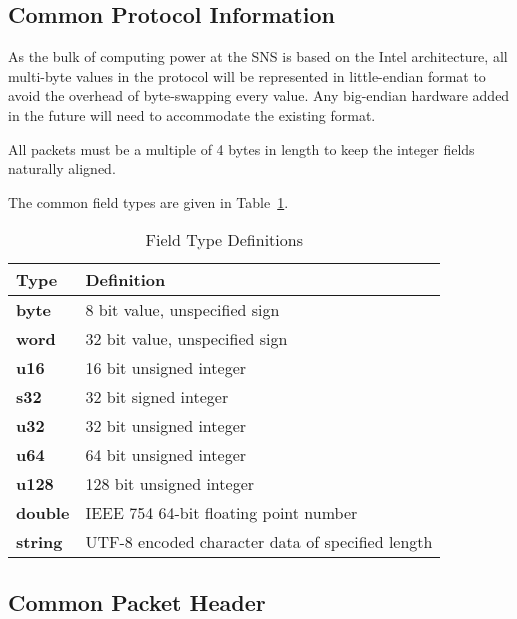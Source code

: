 \subsection{Common Protocol Information}

As the bulk of computing power at the SNS is based on the Intel architecture,
all multi-byte values in the protocol will be represented in little-endian
format to avoid the overhead of byte-swapping every value. Any big-endian
hardware added in the future will need to accommodate the existing format.

All packets must be a multiple of 4 bytes in length to keep the integer
fields naturally aligned.

The common field types are given in Table~\ref{table:protocol_field_types}.

\begin{table}[h]
  \begin{center}
    \begin{tabular}{l | l}
	Type & Definition \\
	\hline
	{\bf byte} & 8 bit value, unspecified sign \\
	{\bf word} & 32 bit value, unspecified sign \\
	{\bf u16} & 16 bit unsigned integer \\
	{\bf s32} & 32 bit signed integer \\
	{\bf u32} & 32 bit unsigned integer \\
	{\bf u64} & 64 bit unsigned integer \\
	{\bf u128} & 128 bit unsigned integer \\
	{\bf double} & IEEE 754 64-bit floating point number \\
	{\bf string} & UTF-8 encoded character data of specified length \\
    \end{tabular}
  \end{center}
  \caption {Field Type Definitions}
  \label{table:protocol_field_types}
\end{table}

\subsection{Common Packet Header}

